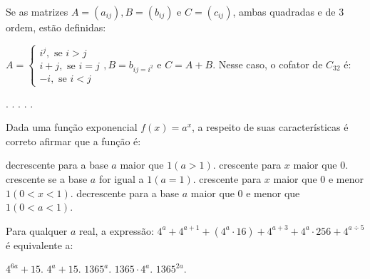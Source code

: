 \begin{question}%
Se as matrizes \(A = (a_{ij}), B = (b_{ij})\) e \(C = (c_{ij})\), ambas quadradas e de 3\textordfeminine{} ordem, estão definidas:

\(A=\begin{cases}
    i^j, \textrm{ se } i> j\\
    i + j, \textrm{ se } i = j\\
    -i, \textrm{ se } i < j
\end{cases} , B = b_{ij = i^2}\) e \(C = A + B\). Nesse caso, o cofator de \(C_{32}\) é:
    \begin{tasks}
        .
        .
        .
        .
        .
    \end{tasks}
\end{question}

\begin{question}%
Dada uma função exponencial \(f(x) = a^x\), a respeito de suas características é correto afirmar que a função é:
    \begin{tasks}
        \task decrescente para a base \(a\) maior que \(1 (a>1)\).
        \task crescente para \(x\) maior que \(0\).
        \task crescente se a base \(a\) for igual a \(1(a=1)\).
        \task crescente para \(x\) maior que \(0\) e menor \(1(0<x<1)\).
        \task decrescente para a base \(a\) maior que \(0\) e menor que \(1(0<a<1)\).
    \end{tasks}
\end{question}

\begin{question}%
Para qualquer \(a\) real, a expressão: \(4^a + 4^{a+1} + (4^a \cdot 16) + 4^{a+3} + 4^a \cdot 256 + 4^{a \div 5}\) é equivalente a:
    \begin{tasks}
        \task \( 4^{6a} + 15\).
        \task \(4^a + 15\).
        \task \(1365^a\).
        \task \(1365 \cdot 4^a\).
        \task \(1365^{2a}\).
    \end{tasks}
\end{question}

